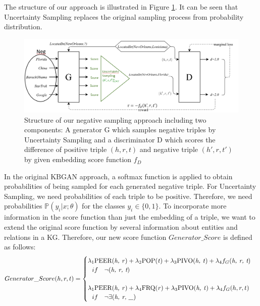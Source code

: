 The structure of our approach is illustrated in Figure \ref{fig:architecture}.
It can be seen that Uncertainty Sampling replaces the original sampling process from probability distribution.
\begin{figure}
    \centering
    \includegraphics[width=\textwidth]{figures/architecture.png}
    \caption{Structure of our negative sampling approach including two components:
    A generator G which samples negative triples by Uncertainty Sampling and a discriminator D which scores the difference of positive triple $(h,r,t)$ and negative triple $(h',r,t')$ by given embedding score function $f_D$}
    \label{fig:architecture}
\end{figure}
In the original \ac{KBGAN} approach, a softmax function is applied to obtain probabilities of being sampled for each generated negative triple.
For Uncertainty Sampling, we need probabilities of each triple to be positive. 
Therefore, we need probabilities $\mathds{P}(y_i | x; \theta)$ for the classes $y_i \in \{0, 1\}$.
To incorporate more information in the score function than just the embedding of a triple, we want to extend the original score function by several information about entities and relations in a \ac{KG}.
Therefore, our new score function $Generator\_Score$ is defined as follows:
\begin{equation}
    Generator\_Score(h, r, t)=
    \begin{cases}
         \lambda_1 \text{PEER(\textit{h, r})} + \lambda_2 \text{POP(\textit{t})} + \lambda_3 \text{PIVO(\textit{h, t})} + \lambda_4 f_G(\textit{h, r, t})
         \\ \ \ 
         if\ \ \ \neg(\textit{h, r, t})
         \\ \\
         \lambda_1 \text{PEER(\textit{h, r})} + \lambda_4 \text{FRQ(\textit{r})} + \lambda_3 \text{PIVO(\textit{h, t})} + \lambda_4 f_G(h, r, t)
         \\ \ \ 
         if\ \ \ \neg \exists (\textit{h, r, \_})
         \\
    \end{cases}
\end{equation}
